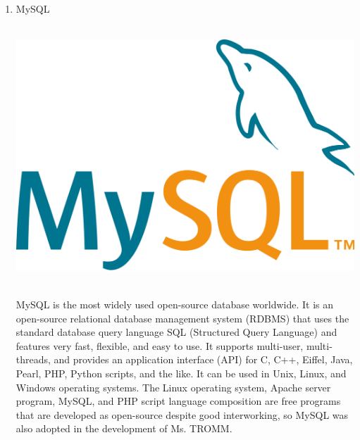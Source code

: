\documentclass[conference]{IEEEtran}
\begin{document}
\begin{enumerate}
    \item MySQL \\ \\
    \centerline{\includegraphics[scale=0.1]{assets/MySQL.png}}
    \\ MySQL is the most widely used open-source database worldwide. It is an open-source relational database management system (RDBMS) that uses the standard database query language SQL (Structured Query Language) and features very fast, flexible, and easy to use. It supports multi-user, multi-threads, and provides an application interface (API) for C, C++, Eiffel, Java, Pearl, PHP, Python scripts, and the like. It can be used in Unix, Linux, and Windows operating systems. The Linux operating system, Apache server program, MySQL, and PHP script language composition are free programs that are developed as open-source despite good interworking, so MySQL was also adopted in the development of Ms. TROMM.

\break 
   

\end{enumerate}
\end{document}

